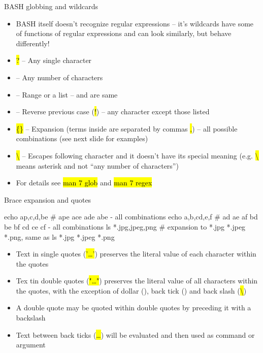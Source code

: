 \documentclass[compress, ucs, xelatex, 11pt, xcolor=svgnames,
  hyperref={
    bookmarks=true,
    unicode=true,
    colorlinks=true,
    pdftitle={Linux, command line and MetaCentrum},
    plainpages=false,
    pdfauthor={Vojtech Zeisek},
    pdfsubject={Course about use of Linux command line, writing shell scripts and using MetaCentrum of CESNET},
    pdfcreator={XeLaTeX},
    pdfkeywords={Linux, GNU, BASH, shell, command line, MetaCentrum},
    linkcolor=DarkRed,
    anchorcolor=DarkBlue,
    citecolor=Indigo,
    filecolor=NavyBlue,
    menucolor=DarkMagenta,
    urlcolor=DarkBlue,
    pdftex},
  url={hyphens, lowtilde} %
  ]{beamer}
\renewcommand{\texttt}[1]{\hl{\ttfamily #1}}
\begin{document}
\begin{frame}{BASH globbing and wildcards}
\begin{itemize}
  \item BASH itself doesn't recognize regular expressions -- it's wildcards have some of functions of regular expressions and can look similarly, but behave differently!
  \item \texttt{?} -- Any single character
  \item \texttt{*} -- Any number of characters
  \item \texttt{[]} -- Range or a list -- \texttt{[abcdef]} and \texttt{[a-f]} are same
  \item \texttt{[!\ldots]} -- Reverse previous case (\texttt{!}) -- any character except those listed
  \item \texttt{\{\}} -- Expansion (terms inside are separated by commas \texttt{,}) -- all possible combinations (see next slide for examples)
  \item \texttt{\textbackslash} -- Escapes following character and it doesn't have its special meaning (e.g. \texttt{\textbackslash *} means asterisk \texttt{*} and not ``any number of characters'')
  \item For details see \texttt{man 7 glob} and \texttt{man 7 regex}
\end{itemize}
\end{frame}

\begin{frame}[fragile]{Brace expansion and quotes}
  \begin{bashcode}
    echo a{p,c,d,b}e # ape ace ade abe - all combinations
    echo {a,b,c}{d,e,f} # ad ae af bd be bf cd ce cf - all combinations
    ls *.{jpg,jpeg,png} # expansion to *.jpg *.jpeg *.png, same as
    ls *.jpg *.jpeg *.png
  \end{bashcode}
\begin{itemize}
  \item Text in single quotes (\texttt{'\ldots'}) preserves the literal value of each character within the quotes
  \item Tex tin double quotes (\texttt{"\ldots"}) preserves the literal value of all characters within the quotes, with the exception of dollar (\texttt{\textdollar}), back tick (\texttt{\textasciigrave}) and back slash (\texttt{\textbackslash})
  \item A double quote may be quoted within double quotes by preceding it with a backslash
  \item Text between back ticks (\texttt{\textasciigrave\ldots\textasciigrave}) will be evaluated and then used as command or argument
\end{itemize}
\end{frame}
\end{document}
